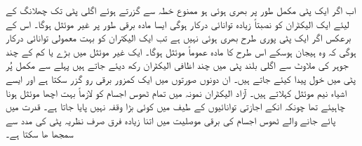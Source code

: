 \documentclass[leqno, b5paper]{khalid-urdu-book}
\begin{document}
 اب اگر ایک پٹی مکمل طور پر بھری ہوئی ہو ممنوع خطہ سے گزرتے ہوئے اگلی پٹی تک چھلانگ کے لیئے ایک الیکٹران کو نصبتاً زیادہ توانائی درکار ہوگی ایسا مادہ برقی طور پر غیر موئثل ہوگا۔ اس کے برعکس اگر ایک پٹی پوری طرح بھری ہوئی نہیں ہے تب ایک الیکتران کو بہت معمولی توانائی درکار ہوگی کہ وہ ہیجان ہوسکے  اس طرح کا مادہ عموماً موئثل ہوگا۔ ایک غیر موئثل میں بڑے یا کم  کے چند جوہر کی ملاوٹ سے اگلی بلند پٹی میں چند اظافی الیکٹران رکھ دیئے جاتے ہیں پہلے سے مکمل پُر پٹی میں خول پیدا کیئے جاتے ہیں۔ ان دونوں صورتوں میں ایک کمزور برقی رو گزر سکتا ہے اور ایسے اشیاء نیم موئثل کہلاتے ہیں۔ آزاد الیکٹران نمونہ میں تمام ٹھوس اجسام کو لازماً بہت اچھا موئثل ہونا چاہیئے تھا چونکہ انکے اجازتی توانائیوں کے طیف میں کوئی بڑا وقفہ نہیں پایا جاتا ہے۔ قدرت میں پائے جانے والے ٹھوس اجسام کی برقی موصلیت میں اتنا زیادہ فرق صرف نظریہ پٹی کی مدد سے سمجھا ھا سکتا ہے۔  
\end{document}
